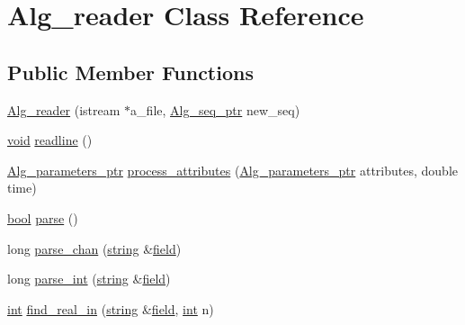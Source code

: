 \hypertarget{class_alg__reader}{}\section{Alg\+\_\+reader Class Reference}
\label{class_alg__reader}
\subsection*{Public Member Functions}
\begin{DoxyCompactItemize}
\item 
\hyperlink{class_alg__reader_a14aa4abac2aa41bd8bf758d7854be110}{Alg\+\_\+reader} (istream $\ast$a\+\_\+file, \hyperlink{allegro_8h_aad5a663237745add3ab7fec40d5f2c87}{Alg\+\_\+seq\+\_\+ptr} new\+\_\+seq)
\item 
\hyperlink{sound_8c_ae35f5844602719cf66324f4de2a658b3}{void} \hyperlink{class_alg__reader_a007920846651a8e90dfdc848160b66ac}{readline} ()
\item 
\hyperlink{allegro_8h_a7367c3f1b2c307bcda6aed01bf8511fa}{Alg\+\_\+parameters\+\_\+ptr} \hyperlink{class_alg__reader_acec89fabbae419198f443d52cf8d101c}{process\+\_\+attributes} (\hyperlink{allegro_8h_a7367c3f1b2c307bcda6aed01bf8511fa}{Alg\+\_\+parameters\+\_\+ptr} attributes, double time)
\item 
\hyperlink{mac_2config_2i386_2lib-src_2libsoxr_2soxr-config_8h_abb452686968e48b67397da5f97445f5b}{bool} \hyperlink{class_alg__reader_a121d626c5c1a18ce19bbfe5a811ee723}{parse} ()
\item 
long \hyperlink{class_alg__reader_add37c250702a7c1aad25b7772ec9f12e}{parse\+\_\+chan} (\hyperlink{test__lib_f_l_a_c_2format_8c_ab02026ad0de9fb6c1b4233deb0a00c75}{string} \&\hyperlink{class_alg__reader_a8dbbb4d9e645c813f48da19a13a97947}{field})
\item 
long \hyperlink{class_alg__reader_a9e67d1eeb889226b5ff00b90a04e5426}{parse\+\_\+int} (\hyperlink{test__lib_f_l_a_c_2format_8c_ab02026ad0de9fb6c1b4233deb0a00c75}{string} \&\hyperlink{class_alg__reader_a8dbbb4d9e645c813f48da19a13a97947}{field})
\item 
\hyperlink{xmltok_8h_a5a0d4a5641ce434f1d23533f2b2e6653}{int} \hyperlink{class_alg__reader_a43132ac5ce26a7f8c1dc612ea17a4cc2}{find\+\_\+real\+\_\+in} (\hyperlink{test__lib_f_l_a_c_2format_8c_ab02026ad0de9fb6c1b4233deb0a00c75}{string} \&\hyperlink{class_alg__reader_a8dbbb4d9e645c813f48da19a13a97947}{field}, \hyperlink{xmltok_8h_a5a0d4a5641ce434f1d23533f2b2e6653}{int} n)
\item 

\end{DoxyCompactItemize}
